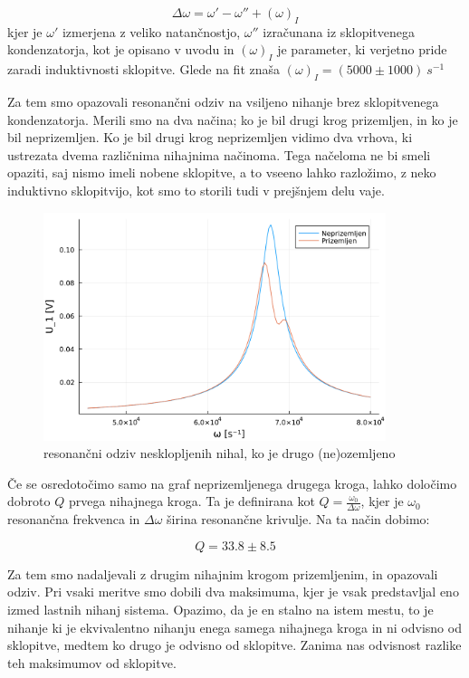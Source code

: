 \documentclass[12pt]{article}
\begin{document}
$$
\Delta \omega = \omega' - \omega '' + (\omega)_I
$$
kjer je $\omega'$ izmerjena z veliko natančnostjo, $\omega ''$ izračunana iz sklopitvenega kondenzatorja, kot je opisano v uvodu in $(\omega)_I$ je parameter, ki verjetno pride zaradi induktivnosti sklopitve. Glede na fit znaša $(\omega)_I = (5000 \pm 1000)\ s^{-1}$

Za tem smo opazovali resonančni odziv na vsiljeno nihanje brez sklopitvenega kondenzatorja. Merili smo na dva načina; ko je bil drugi krog prizemljen, in ko je bil neprizemljen. Ko je bil drugi krog neprizemljen vidimo dva vrhova, ki ustrezata dvema različnima nihajnima načinoma. Tega načeloma ne bi smeli opaziti, saj nismo imeli nobene sklopitve, a to vseeno lahko razložimo, z neko induktivno sklopitvijo, kot smo to storili tudi v prejšnjem delu vaje.

\begin{figure}[ht]
\begin{center}
    \includegraphics[width=10cm]{odziv.pdf}
    \caption{resonančni odziv nesklopljenih nihal, ko je drugo (ne)ozemljeno}
\end{center}
\end{figure}
Če se osredotočimo samo na graf neprizemljenega drugega kroga, lahko določimo dobroto $Q$ prvega nihajnega kroga. Ta je definirana kot $Q = \frac{\omega_0}{\Delta \omega}$, kjer je $\omega_0$ resonančna frekvenca in $\Delta \omega$ širina resonančne krivulje. Na ta način dobimo:

$$
Q = 33.8 \pm 8.5
$$

\newpage
Za tem smo nadaljevali z drugim nihajnim krogom prizemljenim, in opazovali odziv. Pri vsaki meritve smo dobili dva maksimuma, kjer je vsak predstavljal eno izmed lastnih nihanj sistema. Opazimo, da je en stalno na istem mestu, to je nihanje ki je ekvivalentno nihanju enega samega nihajnega kroga in ni odvisno od sklopitve, medtem ko drugo je odvisno od sklopitve. Zanima nas odvisnost razlike teh maksimumov od sklopitve.
\end{document}
